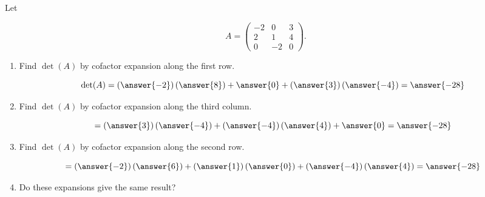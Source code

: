 \documentclass{ximera}
\author{Parisa Fatheddin}
\begin{document}
\begin{exercise}

Let

\[A = \begin{pmatrix}
-2 & 0 & 3\\
2 & 1 & 4 \\
0 & -2 & 0
\end{pmatrix}.
\]

\begin{enumerate}
\item Find $\det(A)$ by cofactor expansion along the first row.

  \begin{prompt}
    \[
      \det(A) = \left(\answer{-2}\right)\left(\answer{8}\right) + \answer{0} + \left(\answer{3}\right)\left(\answer{-4}\right) = \answer{-28}
    \]
  \end{prompt}

\item Find $\det(A)$ by cofactor expansion along the third column.

  \begin{prompt}
    \[
      = \left(\answer{3}\right)\left(\answer{-4}\right) + \left(\answer{-4}\right) \left(\answer{4}\right) + \answer{0} = \answer{-28}
    \]
  \end{prompt}

\item Find $\det(A)$ by cofactor expansion along the second row.

  \begin{prompt}
    \[
      = \left(\answer{-2}\right)\left(\answer{6}\right) + \left(\answer{1}\right)\left(\answer{0}\right) + \left(\answer{-4}\right)\left(\answer{4}\right)= \answer{-28}
    \]
  \end{prompt}

\item Do these expansions give the same result?

  \begin{prompt}
    \begin{multipleChoice}
    \end{multipleChoice}
  \end{prompt}

\end{enumerate}

\end{exercise}
\end{document}
